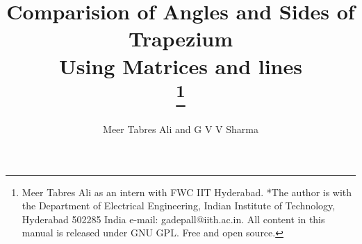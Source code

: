 \documentclass[journal,10pt,twocolumn]{article}
\begin{document}

\let\vec\mathbf




\title{
{Comparision of Angles and Sides of Trapezium\\
Using Matrices and lines}\\

\thanks{Meer Tabres Ali as an intern with FWC IIT Hyderabad. *The author is with the Department of Electrical Engineering, Indian Institute of Technology, Hyderabad 502285 India e-mail: gadepall@iith.ac.in. All content in this manual is released under GNU GPL. Free and open source.}
}
\author{Meer Tabres Ali and G V V Sharma}
\maketitle
\tableofcontents
\end{document}
